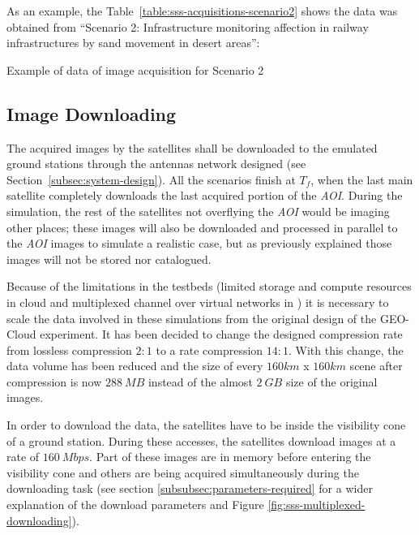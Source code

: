 As an example, the Table~\ref{table:sss-acquisitions-scenario2} shows the data was obtained from ``Scenario 2: Infrastructure monitoring affection in railway infrastructures by sand movement in desert areas'':

\begin{table}[hp]
  \centering
  {\small
  
  }
  \caption{Example of data of image acquisition for Scenario 2}
  \label{table:sss-acquisitions-scenario2}
\end{table}


\subsection{Image Downloading}
\label{subsec:image-downloading}

The acquired images by the satellites shall be downloaded to the emulated ground
stations through the antennas network designed (see Section~\ref{subsec:system-design}). All the scenarios finish at $T_f$, when the last
main satellite completely downloads the last acquired portion of the
\emph{AOI}. During the simulation, the rest of the satellites not overflying the
\emph{AOI} would be imaging other places; these images will also be downloaded
and processed in parallel to the \emph{AOI} images to simulate a realistic case,
but as previously explained those images will not be stored nor catalogued.

Because of the limitations in the testbeds (limited storage and compute
resources in \bonfire cloud and multiplexed channel over virtual networks in
\vw) it is necessary to scale the data involved in these simulations from the
original design of the GEO-Cloud experiment. It has been decided to change the
designed compression rate from lossless compression $2:1$ to a rate compression
$14:1$. With this change, the data volume has been reduced and the size of every
$160km$ x $160km$ scene after compression is now $288~MB$ instead of the almost
$2~GB$ size of the original images.

In order to download the data, the satellites have to be inside the visibility
cone of a ground station. During these accesses, the satellites download images
at a rate of $160~Mbps$. Part of these images are in memory before entering the
visibility cone and others are being acquired simultaneously during the
downloading task (see section \ref{subsubsec:parameters-required} for a wider explanation of the download parameters and Figure \ref{fig:sss-multiplexed-downloading}).

